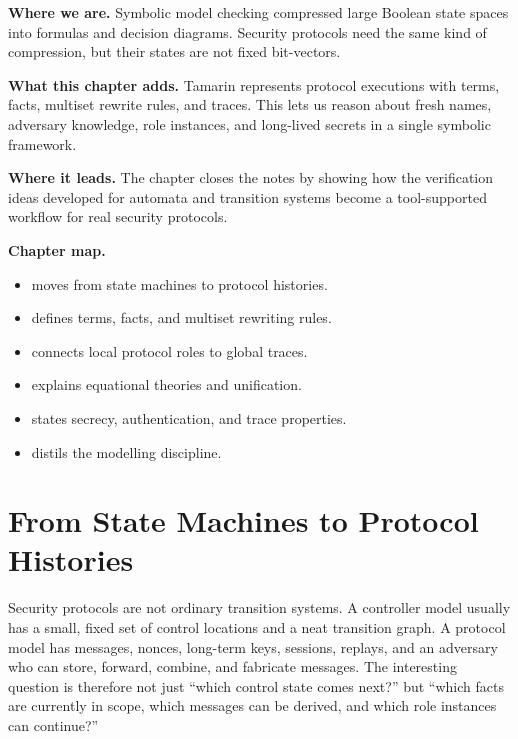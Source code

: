 \begin{chapteropening}
\textbf{Where we are.}  Symbolic model checking compressed large Boolean state
spaces into formulas and decision diagrams.  Security protocols need the same
kind of compression, but their states are not fixed bit-vectors.

\textbf{What this chapter adds.}  Tamarin represents protocol executions with
terms, facts, multiset rewrite rules, and traces.  This lets us reason about
fresh names, adversary knowledge, role instances, and long-lived secrets in a
single symbolic framework.

\textbf{Where it leads.}  The chapter closes the notes by showing how the
verification ideas developed for automata and transition systems become a
tool-supported workflow for real security protocols.

\textbf{Chapter map.}
\begin{itemize}[nosep]
  \item {} moves from state machines to protocol
        histories.
  \item {} defines terms, facts, and multiset rewriting
        rules.
  \item {} connects local protocol roles to
        global traces.
  \item {} explains equational theories and
        unification.
  \item {} states secrecy, authentication, and
        trace properties.
  \item {} distils the modelling discipline.
\end{itemize}
\end{chapteropening}

\section{From State Machines to Protocol Histories}
\label{sec:tamarin-intuition}

Security protocols are not ordinary transition systems.  A controller model
usually has a small, fixed set of control locations and a neat transition
graph.  A protocol model has messages, nonces, long-term keys, sessions,
replays, and an adversary who can store, forward, combine, and fabricate
messages.  The interesting question is therefore not just ``which control
state comes next?'' but ``which facts are currently in scope, which messages
can be derived, and which role instances can continue?''

